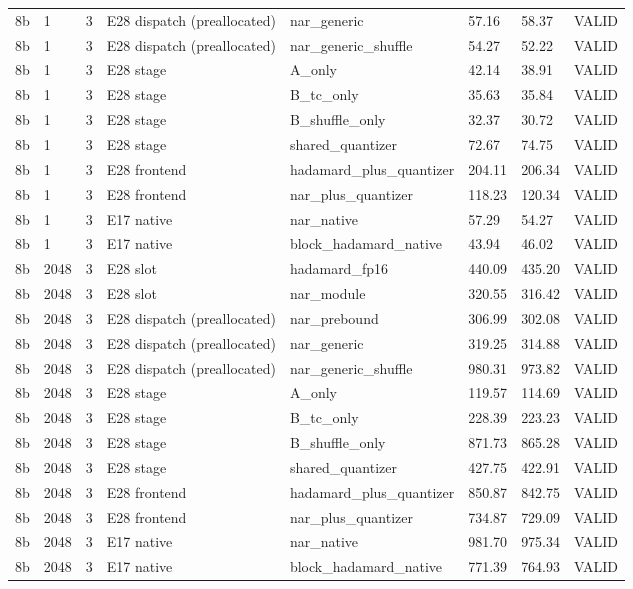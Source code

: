 {\begin{longtable}{llllllll}
8b & 1 & 3 & E28 dispatch (preallocated) & nar\_generic & 57.16 & 58.37 & VALID \\
8b & 1 & 3 & E28 dispatch (preallocated) & nar\_generic\_shuffle & 54.27 & 52.22 & VALID \\
8b & 1 & 3 & E28 stage & A\_only & 42.14 & 38.91 & VALID \\
8b & 1 & 3 & E28 stage & B\_tc\_only & 35.63 & 35.84 & VALID \\
8b & 1 & 3 & E28 stage & B\_shuffle\_only & 32.37 & 30.72 & VALID \\
8b & 1 & 3 & E28 stage & shared\_quantizer & 72.67 & 74.75 & VALID \\
8b & 1 & 3 & E28 frontend & hadamard\_plus\_quantizer & 204.11 & 206.34 & VALID \\
8b & 1 & 3 & E28 frontend & nar\_plus\_quantizer & 118.23 & 120.34 & VALID \\
8b & 1 & 3 & E17 native & nar\_native & 57.29 & 54.27 & VALID \\
8b & 1 & 3 & E17 native & block\_hadamard\_native & 43.94 & 46.02 & VALID \\
8b & 2048 & 3 & E28 slot & hadamard\_fp16 & 440.09 & 435.20 & VALID \\
8b & 2048 & 3 & E28 slot & nar\_module & 320.55 & 316.42 & VALID \\
8b & 2048 & 3 & E28 dispatch (preallocated) & nar\_prebound & 306.99 & 302.08 & VALID \\
8b & 2048 & 3 & E28 dispatch (preallocated) & nar\_generic & 319.25 & 314.88 & VALID \\
8b & 2048 & 3 & E28 dispatch (preallocated) & nar\_generic\_shuffle & 980.31 & 973.82 & VALID \\
8b & 2048 & 3 & E28 stage & A\_only & 119.57 & 114.69 & VALID \\
8b & 2048 & 3 & E28 stage & B\_tc\_only & 228.39 & 223.23 & VALID \\
8b & 2048 & 3 & E28 stage & B\_shuffle\_only & 871.73 & 865.28 & VALID \\
8b & 2048 & 3 & E28 stage & shared\_quantizer & 427.75 & 422.91 & VALID \\
8b & 2048 & 3 & E28 frontend & hadamard\_plus\_quantizer & 850.87 & 842.75 & VALID \\
8b & 2048 & 3 & E28 frontend & nar\_plus\_quantizer & 734.87 & 729.09 & VALID \\
8b & 2048 & 3 & E17 native & nar\_native & 981.70 & 975.34 & VALID \\
8b & 2048 & 3 & E17 native & block\_hadamard\_native & 771.39 & 764.93 & VALID \\

\end{longtable}}

